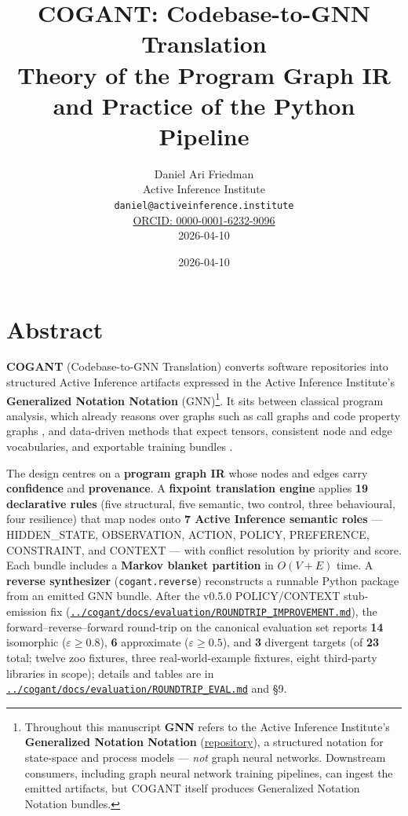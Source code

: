 \documentclass[
]{article}
\author{}
\date{}
\title{COGANT: Codebase-to-GNN Translation\\\normalsize Theory of the Program Graph IR and Practice of the Python Pipeline}
\author{Daniel Ari Friedman\\\footnotesize{Active Inference Institute}\\\footnotesize{\texttt{daniel@activeinference.institute}}\\\footnotesize{\href{https://orcid.org/0000-0001-6232-9096}{ORCID: 0000-0001-6232-9096}} \\ \footnotesize{2026-04-10}}
\date{2026-04-10}
\begin{document}
\maketitle
\thispagestyle{empty}
\tableofcontents
\newpage


\section{Abstract}\label{abstract}

\textbf{COGANT} (Codebase-to-GNN Translation) converts software
repositories into structured Active Inference artifacts expressed in the
Active Inference Institute's \textbf{Generalized Notation Notation}
(GNN)\footnote{Throughout this manuscript \textbf{GNN} refers to the
  Active Inference Institute's \textbf{Generalized Notation Notation}
  (\href{https://github.com/ActiveInferenceInstitute/GeneralizedNotationNotation}{repository}),
  a structured notation for state-space and process models ---
  \emph{not} graph neural networks. Downstream consumers, including
  graph neural network training pipelines, can ingest the emitted
  artifacts, but COGANT itself produces Generalized Notation Notation
  bundles.}. It sits between classical program analysis, which already
reasons over graphs such as call graphs and code property graphs
\citep{yamaguchi2014modeling}, and data-driven methods that expect
tensors, consistent node and edge vocabularies, and exportable training
bundles
\citep{allamanis2018survey, wu2020comprehensive, scarselli2009graph}.

The design centres on a \textbf{program graph IR} whose nodes and edges
carry \textbf{confidence} and \textbf{provenance}. A \textbf{fixpoint
translation engine} applies \textbf{19 declarative rules} (five
structural, five semantic, two control, three behavioural, four
resilience) that map nodes onto \textbf{7 Active Inference semantic
roles} --- HIDDEN\_STATE, OBSERVATION, ACTION, POLICY, PREFERENCE,
CONSTRAINT, and CONTEXT --- with conflict resolution by priority and
score. Each bundle includes a \textbf{Markov blanket partition} in
\(O(V+E)\) time. A \textbf{reverse synthesizer}
(\texttt{cogant.reverse}) reconstructs a runnable Python package from an
emitted GNN bundle. After the v0.5.0 POLICY/CONTEXT stub-emission fix
(\href{../cogant/docs/evaluation/ROUNDTRIP_IMPROVEMENT.md}{\texttt{../cogant/docs/evaluation/ROUNDTRIP\_IMPROVEMENT.md}}),
the forward--reverse--forward round-trip on the canonical evaluation set
reports \textbf{14} isomorphic (\(\varepsilon \geq 0.8\)), \textbf{6}
approximate (\(\varepsilon \geq 0.5\)), and \textbf{3} divergent targets
(of \textbf{23} total; twelve zoo fixtures, three real-world-example
fixtures, eight third-party libraries in scope); details and tables are
in
\href{../cogant/docs/evaluation/ROUNDTRIP_EVAL.md}{\texttt{../cogant/docs/evaluation/ROUNDTRIP\_EVAL.md}}
and §9.
\end{document}
